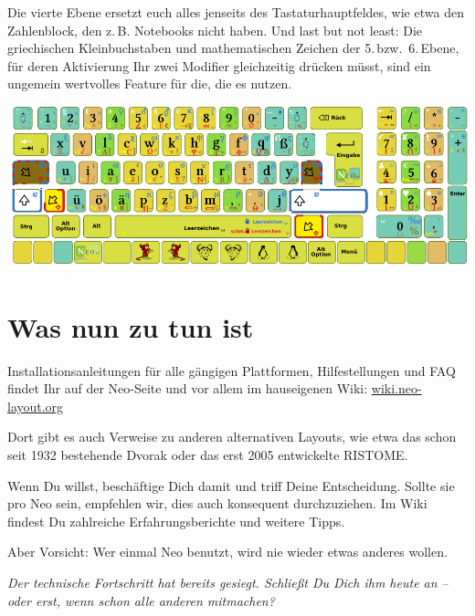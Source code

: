 \documentclass[%
  a4paper
  ,ngerman
  ,notumble
]{leaflet}
\begin{document}
Die vierte Ebene ersetzt euch alles jenseits des Tastaturhauptfeldes, wie etwa den Zahlenblock, den z.\,B. Notebooks nicht haben. Und last but not least: Die griechischen Kleinbuchstaben und mathematischen Zeichen der 5.\,bzw.\ 6.\,Ebene, für deren Aktivierung Ihr zwei Modifier gleichzeitig drücken müsst, sind ein ungemein wertvolles Feature für die, die es nutzen.

\vfill

\hspace*{2ex}
\includegraphics*[width=2.1\linewidth]{neo-druckvorlage}

\section{Was nun zu tun ist}
Installationsanleitungen für alle gängigen Plattformen, Hilfestellungen und FAQ findet Ihr auf der Neo-Seite und vor allem im hauseigenen Wiki: \url{wiki.neo-layout.org} 

Dort gibt es auch Verweise zu anderen alternativen Layouts, wie etwa das schon seit 1932 bestehende Dvorak oder das erst 2005 entwickelte RISTOME. 

Wenn Du willst, beschäftige Dich damit und triff Deine Entscheidung. Sollte sie pro Neo sein, empfehlen wir, dies auch konsequent durchzuziehen. Im Wiki findest Du zahlreiche Erfahrungsberichte und weitere Tipps.

Aber Vorsicht: Wer einmal Neo benutzt, wird nie wieder etwas anderes wollen.

\vspace{12.5em}
\emph{Der technische Fortschritt hat bereits gesiegt. Schließt Du Dich ihm heute an – oder erst, wenn schon alle anderen mitmachen?}

\newpage

\blindtext[6]
\end{document}
